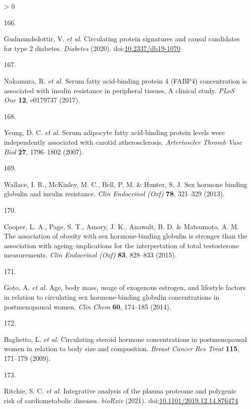 \documentclass[11pt,twoside]{bristolthesis}
\newlength{\cslhangindent}
\newlength{\csllabelwidth}
\newenvironment{CSLReferences}[2] %
 {%
  \setlength{\parindent}{0pt}
  \ifodd #1 \everypar{\setlength{\hangindent}{\cslhangindent}}\ignorespaces\fi
  \ifnum #2 > 0
  \setlength{\parskip}{#2\baselineskip}
  \fi
 }%
 {}
\newcommand{\CSLLeftMargin}[1]{\parbox[t]{\csllabelwidth}{#1}}
\newcommand{\CSLRightInline}[1]{\parbox[t]{\linewidth - \csllabelwidth}{#1}\break}
\begin{document}
\begin{CSLReferences}{0}{0}
\leavevmode\hypertarget{ref-Gudmundsdottir2020}{}%
\CSLLeftMargin{166. }
\CSLRightInline{Gudmundsdottir, V. \emph{et al.} {Circulating protein signatures and causal candidates for type 2 diabetes}. \emph{Diabetes} (2020). doi:\href{https://doi.org/10.2337/db19-1070}{10.2337/db19-1070}}

\leavevmode\hypertarget{ref-Nakamura2017}{}%
\CSLLeftMargin{167. }
\CSLRightInline{Nakamura, R. \emph{et al.} {Serum fatty acid-binding protein 4 (FABP4) concentration is associated with insulin resistance in peripheral tissues, A clinical study}. \emph{PLoS One} \textbf{12}, e0179737 (2017).}

\leavevmode\hypertarget{ref-Yeung2007}{}%
\CSLLeftMargin{168. }
\CSLRightInline{Yeung, D. C. \emph{et al.} {Serum adipocyte fatty acid-binding protein levels were independently associated with carotid atherosclerosis}. \emph{Arterioscler Thromb Vasc Biol} \textbf{27}, 1796--1802 (2007).}

\leavevmode\hypertarget{ref-Wallace2013}{}%
\CSLLeftMargin{169. }
\CSLRightInline{Wallace, I. R., McKinley, M. C., Bell, P. M. \& Hunter, S. J. {Sex hormone binding globulin and insulin resistance}. \emph{Clin Endocrinol (Oxf)} \textbf{78}, 321--329 (2013).}

\leavevmode\hypertarget{ref-Cooper2015}{}%
\CSLLeftMargin{170. }
\CSLRightInline{Cooper, L. A., Page, S. T., Amory, J. K., Anawalt, B. D. \& Matsumoto, A. M. {The association of obesity with sex hormone-binding globulin is stronger than the association with ageing--implications for the interpretation of total testosterone measurements}. \emph{Clin Endocrinol (Oxf)} \textbf{83}, 828--833 (2015).}

\leavevmode\hypertarget{ref-Goto2014}{}%
\CSLLeftMargin{171. }
\CSLRightInline{Goto, A. \emph{et al.} {Age, body mass, usage of exogenous estrogen, and lifestyle factors in relation to circulating sex hormone-binding globulin concentrations in postmenopausal women}. \emph{Clin Chem} \textbf{60}, 174--185 (2014).}

\leavevmode\hypertarget{ref-Baglietto2009}{}%
\CSLLeftMargin{172. }
\CSLRightInline{Baglietto, L. \emph{et al.} {Circulating steroid hormone concentrations in postmenopausal women in relation to body size and composition}. \emph{Breast Cancer Res Treat} \textbf{115}, 171--179 (2009).}

\leavevmode\hypertarget{ref-Ritchie2019}{}%
\CSLLeftMargin{173. }
\CSLRightInline{Ritchie, S. C. \emph{et al.} {Integrative analysis of the plasma proteome and polygenic risk of cardiometabolic diseases}. \emph{bioRxiv} (2021). doi:\href{https://doi.org/10.1101/2019.12.14.876474}{10.1101/2019.12.14.876474}}


\end{CSLReferences}
\end{document}
